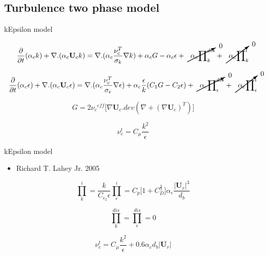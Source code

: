 \documentclass{beamer}
\begin{document}
\subsection{Turbulence two phase model }

\begin{frame}{kEpsilon model}


\begin{equation}
\frac{\partial}{\partial t} (\alpha_c k)+\nabla. (\alpha_c \textbf{U}_c k) = \nabla. (\alpha_c \frac{\nu_c^{T}}{\sigma_k} \nabla k)+\alpha_c G - \alpha_c \epsilon +\cancelto{0}{\alpha_c {\prod}_k^{dis}}+\cancelto{0}{\alpha_c {\prod}_k^i} 
\end{equation}


\begin{equation}
\frac{\partial}{\partial t} (\alpha_c \epsilon)+\nabla. (\alpha_c \textbf{U}_c \epsilon) = \nabla. (\alpha_c \frac{\nu_c^{T}}{\sigma_\epsilon} \nabla \epsilon)+ \alpha_c \frac{\epsilon}{k}(C_1G-C_2\epsilon)+\cancelto{0}{\alpha_c {\prod}_\epsilon^{dis}}+\cancelto{0}{\alpha_c {\prod}_\epsilon^i}  
\end{equation}

\begin{equation}
G = 2{\nu_c}^{eff} \big[ \nabla \textbf{U}_c.\textit{dev} (\nabla+{(\nabla \textbf{U}_c)}^T) \big]
\end{equation}

\begin{equation}
\nu_c^{t}= C_\mu \frac{k^2}{\epsilon}
\end{equation}

\end{frame}

\begin{frame}{kEpsilon model}

\begin{itemize}
  \item Richard T. Lahey Jr. 2005 
\end{itemize}


\begin{equation}
{\prod}_k^i= \frac{k}{C_{\epsilon_2} \epsilon} {\prod}_\epsilon^i  = C_p \big[ 1+C_D^{\frac{4}{3}} \big] \alpha_c \frac{|\textbf{U}_r|^3}{d_b}
\end{equation} 

\begin{equation}
{\prod}_k^{dis} = {\prod}_\epsilon^{dis} =0
\end{equation}

\begin{equation}
\nu_c^{t}= C_\mu \frac{k^2}{\epsilon}+0.6 \alpha_c d_b |\textbf{U}_r|
\end{equation}

\end{frame}
\end{document}
